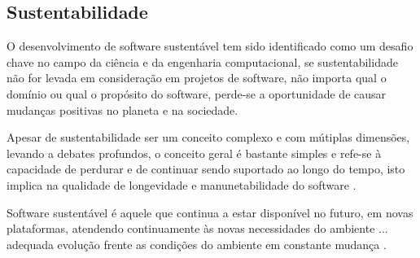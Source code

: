 

\subsection{Sustentabilidade}

O desenvolvimento de software sustentável tem sido identificado como um desafio
chave no campo da ciência e da engenharia computacional, se sustentabilidade
não for levada em consideração em projetos de software, não importa qual o
domínio ou qual o propósito do software, perde-se a oportunidade de causar
mudanças positivas no planeta e na sociedade.

Apesar de sustentabilidade ser um conceito complexo e com mútiplas dimensões,
levando a debates profundos, o conceito geral é bastante simples e refe-se à
capacidade de perdurar e de continuar sendo suportado ao longo do tempo, isto
implica na qualidade de longevidade e manunetabilidade do software
\cite{venters2014software}.

Software sustentável é aquele que continua a estar disponível no futuro, em
novas plataformas, atendendo continuamente às novas necessidades do ambiente
... adequada evolução frente as condições do ambiente em constante mudança
\cite{allen2017engineering}.


%
%
%


